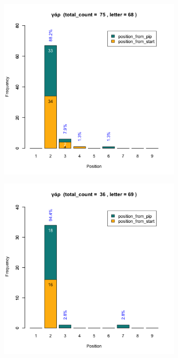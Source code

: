\documentclass[a4paper]{article}
\begin{document}
\begin{figure}
\begin{subfigure}{0.45\textwidth}
\end{subfigure}
\begin{subfigure}{0.45\textwidth}
\centering
\includegraphics[width=1\linewidth]{../../data/output/paul_R_par/plots/par1_lt68.png}
\end{subfigure}
\begin{subfigure}{0.45\textwidth}
\centering
\includegraphics[width=1\linewidth]{../../data/output/paul_R_par/plots/par1_lt69.png}

\end{subfigure}
\end{figure}
\end{document}
